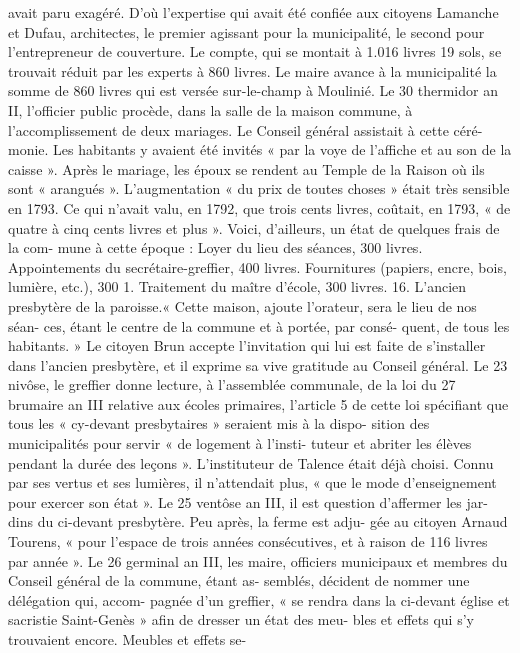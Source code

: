 \documentclass[a4paper,11pt]{book}
\begin{document}
avait paru exagéré. D'où l'expertise qui avait été confiée
aux citoyens Lamanche et Dufau, architectes, le premier
agissant pour la municipalité, le second pour l'entrepreneur
de couverture.
Le compte, qui se montait à 1.016 livres 19 sols, se
trouvait réduit par les experts à 860 livres.
Le maire avance à la municipalité la somme de 860 livres
qui est versée sur-le-champ à Moulinié.
Le 30 thermidor an II, l'officier public procède, dans
la salle de la maison commune, à l'accomplissement de
deux mariages. Le Conseil général assistait à cette céré-
monie. Les habitants y avaient été invités « par la voye
de l'affiche et au son de la caisse ».
Après le mariage, les époux se rendent au Temple de
la Raison où ils sont « arangués ».
L'augmentation « du prix de toutes choses » était très
sensible en 1793. Ce qui n'avait valu, en 1792, que trois
cents livres, coûtait, en 1793, « de quatre à cinq cents livres
et plus ».
Voici, d'ailleurs, un état de quelques frais de la com-
mune à cette époque :
Loyer du lieu des séances, 300 livres.
Appointements du secrétaire-greffier, 400 livres.
Fournitures (papiers, encre, bois, lumière, etc.), 300 1.
Traitement du maître d'école, 300 livres.
16. L'ancien presbytère de la paroisse.« Cette maison, ajoute l'orateur, sera le lieu de nos séan-
ces, étant le centre de la commune et à portée, par consé-
quent, de tous les habitants. »
Le citoyen Brun accepte l'invitation qui lui est faite de
s'installer dans l'ancien presbytère, et il exprime sa vive
gratitude au Conseil général.
Le 23 nivôse, le greffier donne lecture, à l'assemblée
communale, de la loi du 27 brumaire an III relative aux
écoles primaires, l'article 5 de cette loi spécifiant que
tous les « cy-devant presbytaires » seraient mis à la dispo-
sition des municipalités pour servir « de logement à l'insti-
tuteur et abriter les élèves pendant la durée des leçons ».
L'instituteur de Talence était déjà choisi. Connu par
ses vertus et ses lumières, il n'attendait plus, « que le mode
d'enseignement pour exercer son état ».
Le 25 ventôse an III, il est question d'affermer les jar-
dins du ci-devant presbytère. Peu après, la ferme est adju-
gée au citoyen Arnaud Tourens, « pour l'espace de trois
années consécutives, et à raison de 116 livres par année ».
Le 26 germinal an III, les maire, officiers municipaux
et membres du Conseil général de la commune, étant as-
semblés, décident de nommer une délégation qui, accom-
pagnée d'un greffier, « se rendra dans la ci-devant église
et sacristie Saint-Genès » afin de dresser un état des meu-
bles et effets qui s'y trouvaient encore. Meubles et effets se-
\end{document}
